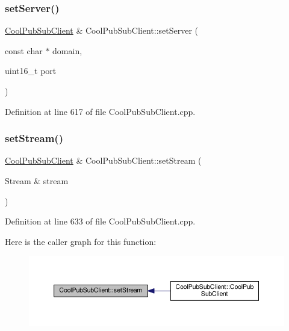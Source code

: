 \subsubsection{\texorpdfstring{set\+Server()}{setServer()}\hspace{0.1cm}{\footnotesize\ttfamily [3/3]}}
{\footnotesize\ttfamily \hyperlink{class_cool_pub_sub_client}{Cool\+Pub\+Sub\+Client} \& Cool\+Pub\+Sub\+Client\+::set\+Server (\begin{DoxyParamCaption}\item[{const char $\ast$}]{domain,  }\item[{uint16\+\_\+t}]{port }\end{DoxyParamCaption})}



Definition at line 617 of file Cool\+Pub\+Sub\+Client.\+cpp.

\mbox{\label{class_cool_pub_sub_client_ae97e40823ea689ff9e36d5bdd71bb933}} 
\subsubsection{\texorpdfstring{set\+Stream()}{setStream()}}
{\footnotesize\ttfamily \hyperlink{class_cool_pub_sub_client}{Cool\+Pub\+Sub\+Client} \& Cool\+Pub\+Sub\+Client\+::set\+Stream (\begin{DoxyParamCaption}\item[{Stream \&}]{stream }\end{DoxyParamCaption})}



Definition at line 633 of file Cool\+Pub\+Sub\+Client.\+cpp.

Here is the caller graph for this function\+:\nopagebreak
\begin{figure}[H]
\begin{center}
\leavevmode
\includegraphics[width=350pt]{class_cool_pub_sub_client_ae97e40823ea689ff9e36d5bdd71bb933_icgraph}
\end{center}
\end{figure}
\mbox{\label{class_cool_pub_sub_client_a2276c7e52531b597b4342fadf3722f43}} 

